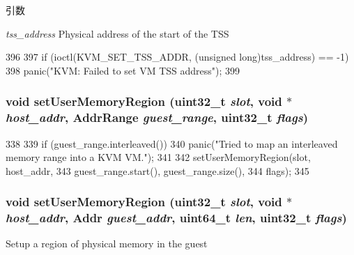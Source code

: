 \begin{DoxyParams}{引数}
\item[{\em tss\_\-address}]Physical address of the start of the TSS \end{DoxyParams}



\begin{DoxyCode}
396 {
397     if (ioctl(KVM_SET_TSS_ADDR, (unsigned long)tss_address) == -1)
398         panic("KVM: Failed to set VM TSS address\n");
399 }
\end{DoxyCode}
\hypertarget{classKvmVM_a2ec4864d5df313708eff4cda418d8d01}{
\subsubsection[{setUserMemoryRegion}]{\setlength{\rightskip}{0pt plus 5cm}void setUserMemoryRegion ({\bf uint32\_\-t} {\em slot}, \/  void $\ast$ {\em host\_\-addr}, \/  {\bf AddrRange} {\em guest\_\-range}, \/  {\bf uint32\_\-t} {\em flags})}}
\label{classKvmVM_a2ec4864d5df313708eff4cda418d8d01}



\begin{DoxyCode}
338 {
339     if (guest_range.interleaved())
340         panic("Tried to map an interleaved memory range into a KVM VM.\n");
341 
342     setUserMemoryRegion(slot, host_addr,
343                         guest_range.start(), guest_range.size(),
344                         flags);
345 }
\end{DoxyCode}
\hypertarget{classKvmVM_a2d2ed492c91fc674db226f86fae39127}{
\subsubsection[{setUserMemoryRegion}]{\setlength{\rightskip}{0pt plus 5cm}void setUserMemoryRegion ({\bf uint32\_\-t} {\em slot}, \/  void $\ast$ {\em host\_\-addr}, \/  {\bf Addr} {\em guest\_\-addr}, \/  uint64\_\-t {\em len}, \/  {\bf uint32\_\-t} {\em flags})}}
\label{classKvmVM_a2d2ed492c91fc674db226f86fae39127}
Setup a region of physical memory in the guest


